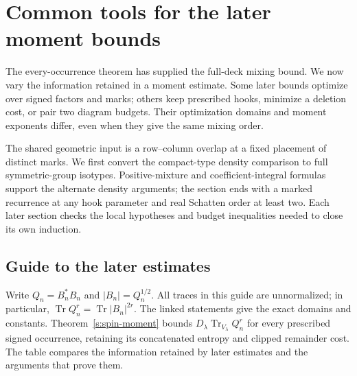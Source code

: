 \section{Common tools for the later moment bounds}
\label{s:full-isotypic-section}
The every-occurrence theorem has supplied the full-deck mixing bound.
We now vary the information retained in a moment estimate. Some later
bounds optimize over signed factors and marks; others keep prescribed
hooks, minimize a deletion cost, or pair two diagram budgets. Their
optimization domains and moment exponents differ, even when they give
the same mixing order.

The shared geometric input is a row--column overlap at a fixed
placement of distinct marks. We first convert the compact-type density
comparison to full symmetric-group isotypes. Positive-mixture and
coefficient-integral formulas support the alternate density arguments;
the section ends with a marked recurrence at any hook parameter and
real Schatten order at least two. Each later section checks the local
hypotheses and budget inequalities needed to close its own induction.

\subsection{Guide to the later estimates}\label{s:later-routes}
Write \(Q_n=B_n^*B_n\) and \(\lvert B_n\rvert=Q_n^{1/2}\). All traces
in this guide are unnormalized; in particular,
\(\operatorname{Tr}Q_n^r=\operatorname{Tr}\lvert B_n\rvert^{2r}\).
The linked statements give the exact domains and constants.
Theorem~\ref{s:spin-moment} bounds
\(D_\lambda\operatorname{Tr}_{V_\lambda}Q_n^r\) for every prescribed
signed occurrence, retaining its concatenated entropy and clipped
remainder cost. The table compares the information retained by later
estimates and the arguments that prove them.

